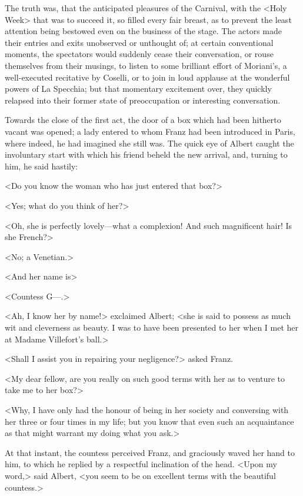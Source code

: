  The truth was, that the anticipated pleasures of the Carnival, with the <Holy Week> that was to succeed it, so filled every fair breast, as to prevent the least attention being bestowed even on the business of the stage. The actors made their entries and exits unobserved or unthought of; at certain conventional moments, the spectators would suddenly cease their conversation, or rouse themselves from their musings, to listen to some brilliant effort of Moriani's, a well-executed recitative by Coselli, or to join in loud applause at the wonderful powers of La Specchia; but that momentary excitement over, they quickly relapsed into their former state of preoccupation or interesting conversation. 

 Towards the close of the first act, the door of a box which had been hitherto vacant was opened; a lady entered to whom Franz had been introduced in Paris, where indeed, he had imagined she still was. The quick eye of Albert caught the involuntary start with which his friend beheld the new arrival, and, turning to him, he said hastily: 

 <Do you know the woman who has just entered that box?> 

 <Yes; what do you think of her?> 

 <Oh, she is perfectly lovely—what a complexion! And such magnificent hair! Is she French?> 

 <No; a Venetian.> 

 <And her name is\longdash> 

 <Countess G—.> 

 <Ah, I know her by name!> exclaimed Albert; <she is said to possess as much wit and cleverness as beauty. I was to have been presented to her when I met her at Madame Villefort's ball.> 

 <Shall I assist you in repairing your negligence?> asked Franz. 

 <My dear fellow, are you really on such good terms with her as to venture to take me to her box?> 

 <Why, I have only had the honour of being in her society and conversing with her three or four times in my life; but you know that even such an acquaintance as that might warrant my doing what you ask.> 

 At that instant, the countess perceived Franz, and graciously waved her hand to him, to which he replied by a respectful inclination of the head. <Upon my word,> said Albert, <you seem to be on excellent terms with the beautiful countess.> 

